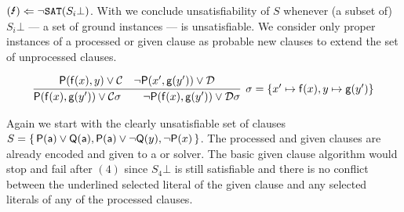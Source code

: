 \begin{remark}
\( \text{(\Lightning)} \Leftarrow \UNSAT(S_i\bot) \).
With \InstGen{} we conclude unsatisfiability of \( S \) whenever (a subset of) \( S_i\bot \) --- a set of ground instances --- is unsatisfiable.
We consider only proper instances of a processed or given clause
as probable new clauses to extend the set of unprocessed clauses.
\end{remark}
\vspace{-1em}
\begin{gather*}
	\infer[\sigma=\{ x'\mapsto\mf(x), y\mapsto\mg(y') \}]{
		\mP(\mf(x),\mg(y')) \lor\mcC\sigma
		\qquad
		\lnot\mP(\mf(x),\mg(y'))\lor\mcD\sigma
	}{
		\mP(\mf(x), y) \lor \mcC & \lnot\mP(x',\mg(y')) \lor \mcD
	}
\end{gather*}

\begin{example}
	Again we start with the clearly unsatisfiable set of clauses
\( S=\{ \, \mathsf{P}(\mathsf{a})\lor\mathsf{Q}(\mathsf{a}), \mathsf{P}(\mathsf{a})\lor\lnot\mathsf{Q}(y), \lnot\mathsf{P}(x) \, \} \).
	The processed and given clauses are already encoded and
	given to a \SAT{} or \SMT{} solver.
	The basic given clause algorithm would stop and fail after \( (4) \)
	since \( S_4\bot \) is still satisfiable and there is no conflict between the underlined selected literal of the given clause
	and any selected literals of any of the processed clauses.


\end{example}
